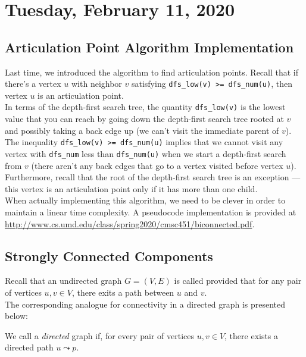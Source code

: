 \newpage
\section{Tuesday, February 11, 2020}

\subsection{Articulation Point Algorithm Implementation}

Last time, we introduced the algorithm to find articulation points. Recall that if there's a vertex $u$ with neighbor $v$ satisfying \verb!dfs_low(v) >= dfs_num(u)!, then vertex $u$ is an articulation point. \\

In terms of the depth-first search tree, the quantity \verb!dfs_low(v)! is the lowest value that you can reach by going down the depth-first search tree rooted at $v$ and possibly taking a back edge up (we can't visit the immediate parent of $v$). The inequality \verb!dfs_low(v) >= dfs_num(u)! implies that we cannot visit any vertex with \verb!dfs_num! less than \verb!dfs_num(u)! when we start a depth-first search from $v$ (there aren't any back edges that go to a vertex visited before vertex $u$). \\ 

Furthermore, recall that the root of the depth-first search tree is an exception --- this vertex is an articulation point only if it has more than one child. \\

When actually implementing this algorithm, we need to be clever in order to maintain a linear time complexity.  A pseudocode implementation is provided at \url{http://www.cs.umd.edu/class/spring2020/cmsc451/biconnected.pdf}. \\


\subsection{Strongly Connected Components}


Recall that an undirected graph $G = (V, E)$ is called  provided that for any pair of vertices $u, v \in V$, there exits a path between $u$ and $v$. \\

The corresponding analogue for connectivity in a directed graph is presented below:

\begin{definition}
We call a \textit{directed} graph  if, for every pair of vertices $u, v\in V$, there exists a directed path $u\leadsto p$.  
\end{definition}

